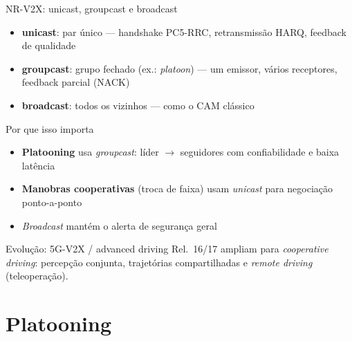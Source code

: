\documentclass[aspectratio=169,11pt]{beamer}
\begin{document}
\begin{frame}{NR-V2X: unicast, groupcast e broadcast}
  \begin{itemize}
    \item \textbf{unicast}: par único --- handshake PC5-RRC, retransmissão HARQ, feedback de qualidade
    \item \textbf{groupcast}: grupo fechado (ex.: \emph{platoon}) --- um emissor, vários receptores, feedback parcial (NACK)
    \item \textbf{broadcast}: todos os vizinhos --- como o CAM clássico
  \end{itemize}
  \begin{block}{Por que isso importa}
    \begin{itemize}
      \item \textbf{Platooning} usa \emph{groupcast}: líder $\rightarrow$ seguidores com confiabilidade e baixa latência
      \item \textbf{Manobras cooperativas} (troca de faixa) usam \emph{unicast} para negociação ponto-a-ponto
      \item \emph{Broadcast} mantém o alerta de segurança geral
    \end{itemize}
  \end{block}
  \begin{exampleblock}{Evolução: 5G-V2X / advanced driving}
    Rel.~16/17 ampliam para \emph{cooperative driving}: percepção conjunta, trajetórias compartilhadas e \emph{remote driving} (teleoperação).
  \end{exampleblock}
\end{frame}

\section{Platooning}
\end{document}
